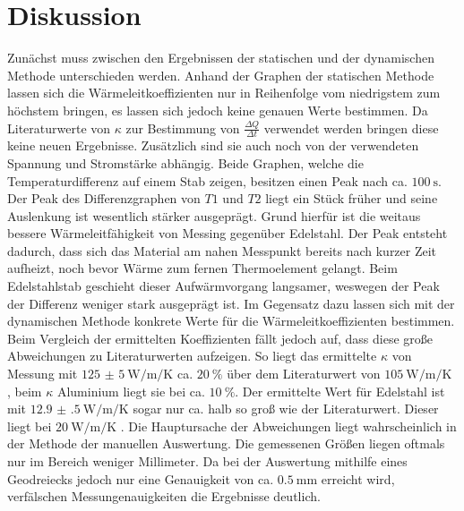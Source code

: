 
\section{Diskussion}
\label{sec:Diskussion}
Zunächst muss zwischen den Ergebnissen der statischen und der dynamischen Methode
 unterschieden werden. Anhand der Graphen der statischen Methode lassen sich
 die Wärmeleitkoeffizienten nur in Reihenfolge vom niedrigstem zum höchstem bringen,
 es lassen sich jedoch keine genauen Werte bestimmen. Da Literaturwerte
 von $\kappa$ zur Bestimmung von $\frac{\Delta Q}{\Delta t}$ verwendet werden
 bringen diese keine neuen Ergebnisse. Zusätzlich sind sie auch noch von der
 verwendeten Spannung und Stromstärke abhängig. Beide Graphen, welche die
 Temperaturdifferenz auf einem Stab zeigen, besitzen einen Peak nach
 ca. $\SI{100}{\second}$. Der Peak des Differenzgraphen von $T1$ und $T2$ 
liegt ein Stück früher und seine Auslenkung ist wesentlich stärker ausgeprägt. Grund hierfür ist die  weitaus bessere
 Wärmeleitfähigkeit von Messing gegenüber Edelstahl. Der Peak entsteht dadurch, dass sich das
 Material am nahen Messpunkt bereits nach kurzer Zeit aufheizt, noch bevor Wärme zum fernen Thermoelement gelangt. Beim Edelstahlstab geschieht
 dieser Aufwärmvorgang langsamer, weswegen der Peak der Differenz weniger stark ausgeprägt ist. Im
 Gegensatz dazu lassen sich mit der dynamischen Methode konkrete Werte für die
 Wärmeleitkoeffizienten bestimmen. Beim Vergleich der ermittelten Koeffizienten
  fällt jedoch auf, dass diese große Abweichungen zu Literaturwerten \cite{km} aufzeigen.
  So liegt das ermittelte $\kappa$ von Messung mit
  $\SI{125(5)}{\watt\per\meter\per\kelvin}$ ca. $\SI{20}{\percent}$ über
  dem Literaturwert von $\SI{105}{\watt\per\meter\per\kelvin}$ \cite{km}, beim $\kappa$
  Aluminium liegt sie bei ca. $\SI{10}{\percent}$. Der ermittelte Wert für
  Edelstahl ist mit $\SI{12.9(5)}{\watt\per\meter\per\kelvin}$ sogar
   nur ca. halb so groß wie der Literaturwert. Dieser liegt bei $\SI{20}{\watt\per\meter\per\kelvin}$ \cite{km}.
   Die Hauptursache der Abweichungen liegt wahrscheinlich in der Methode der manuellen
   Auswertung. Die gemessenen Größen liegen oftmals nur im Bereich weniger Millimeter.
   Da bei der Auswertung mithilfe eines Geodreiecks jedoch nur eine
   Genauigkeit von ca. $\SI{0.5}{\milli\meter}$ erreicht wird, verfälschen
   Messungenauigkeiten die Ergebnisse deutlich.
